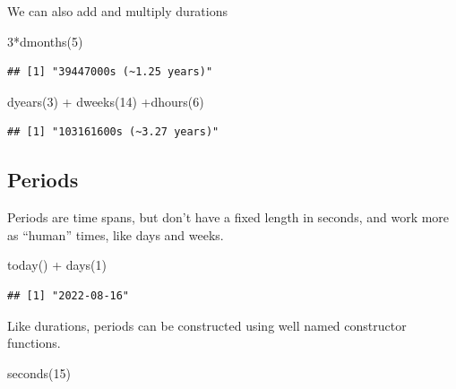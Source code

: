 \documentclass[
]{book}
\newenvironment{Shaded}{\begin{snugshade}}{\end{snugshade}}
\newcommand{\DecValTok}[1]{\textcolor[rgb]{0.00,0.00,0.81}{#1}}
\newcommand{\FunctionTok}[1]{\textcolor[rgb]{0.00,0.00,0.00}{#1}}
\newcommand{\NormalTok}[1]{#1}
\newcommand{\SpecialCharTok}[1]{\textcolor[rgb]{0.00,0.00,0.00}{#1}}
\begin{document}
We can also add and multiply durations

\begin{Shaded}
\begin{Highlighting}[]
\DecValTok{3}\SpecialCharTok{*}\FunctionTok{dmonths}\NormalTok{(}\DecValTok{5}\NormalTok{)}
\end{Highlighting}
\end{Shaded}

\begin{verbatim}
## [1] "39447000s (~1.25 years)"
\end{verbatim}

\begin{Shaded}
\begin{Highlighting}[]
\FunctionTok{dyears}\NormalTok{(}\DecValTok{3}\NormalTok{) }\SpecialCharTok{+} \FunctionTok{dweeks}\NormalTok{(}\DecValTok{14}\NormalTok{) }\SpecialCharTok{+}\FunctionTok{dhours}\NormalTok{(}\DecValTok{6}\NormalTok{)}
\end{Highlighting}
\end{Shaded}

\begin{verbatim}
## [1] "103161600s (~3.27 years)"
\end{verbatim}

\hypertarget{periods}{%
\subsection{Periods}\label{periods}}

Periods are time spans, but don't have a fixed length in seconds, and work more as ``human'' times, like days and weeks.

\begin{Shaded}
\begin{Highlighting}[]
\FunctionTok{today}\NormalTok{() }\SpecialCharTok{+} \FunctionTok{days}\NormalTok{(}\DecValTok{1}\NormalTok{)}
\end{Highlighting}
\end{Shaded}

\begin{verbatim}
## [1] "2022-08-16"
\end{verbatim}

Like durations, periods can be constructed using well named constructor functions.

\begin{Shaded}
\begin{Highlighting}[]
\FunctionTok{seconds}\NormalTok{(}\DecValTok{15}\NormalTok{)}
\end{Highlighting}
\end{Shaded}
\end{document}
